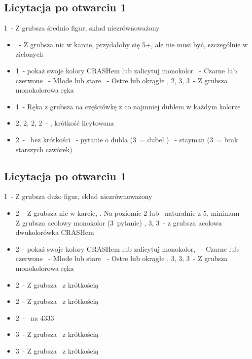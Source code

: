\documentclass[12pt, a4paper]{article}
\begin{document}
\pagebreak
\subsection{Licytacja po otwarciu 1\hearts}
\begin{formal}
    1\hearts\ - Z grubsza średnio figur, skład niezrównoważony
\end{formal}
\begin{itemize}
    \item \pass\ - Z grubsza nic w karcie, przydałoby się 5+\hearts, ale nie musi być, szczególnie w zielonych
    \item 1\spades\ - pokaż swoje kolory CRASHem lub zalicytuj monokolor
    \nt\ - Czarne lub czerwone
    \clubs\ - Młode lub stare
    \diams\ - Ostre lub okrągłe
    \hearts, 2\spades, 3\clubs, 3\diams\ - Z grubsza monokolorowa ręka
    \item 1\nt\ - Ręka z grubsza na częściówkę z co najmniej dublem w każdym kolorze
    \item 2\clubs, 2\diams, 2\hearts, 2\spades\ - \gf, krótkość licytowana
    \item 2\nt\ - \gf\ bez krótkości
    \clubs\ - pytanie o dubla (3\nt\ = dubel \clubs)
    \diams\ - stayman (3\nt\ = brak starszych czwórek)
\end{itemize}

\pagebreak
\subsection{Licytacja po otwarciu 1\ntx}
\begin{formal}
    1\nt\ - Z grubsza dużo figur, skład niezrównoważony
\end{formal}
\begin{itemize}
    \item 2\clubs\ - Z grubsza nic w karcie, \nf.
    \subitem Na poziomie 2 lub \pass\ naturalnie z 5, minimum
    \nt\ - Z grubsza acolowy monokolor (3\clubs\ pytanie)
    \clubs, 3\diams, 3\hearts\ - z grubsza acolowa dwukolorówka CRASHem
    \item 2\diams\ - pokaż swoje kolory CRASHem lub zalicytuj monokolor, \gf
    \hearts\ - Czarne lub czerwone
    \spades\ - Młode lub stare
    \nt\ - Ostre lub okrągłe
    \clubs, 3\diams, 3\hearts, 3\spades\ - Z grubsza monokolorowa ręka
    \item 2\hearts\ - Z grubsza \gf\ z krótkością \hearts
    \item 2\spades\ - Z grubsza \gf\ z krótkością \spades
    \item 2\nt\ - \gf\ na 4333
    \item 3\clubs\ - Z grubsza \gf\ z krótkością \clubs
    \item 3\diams\ - Z grubsza \gf\ z krótkością \diams 
\end{itemize}
\end{document}
